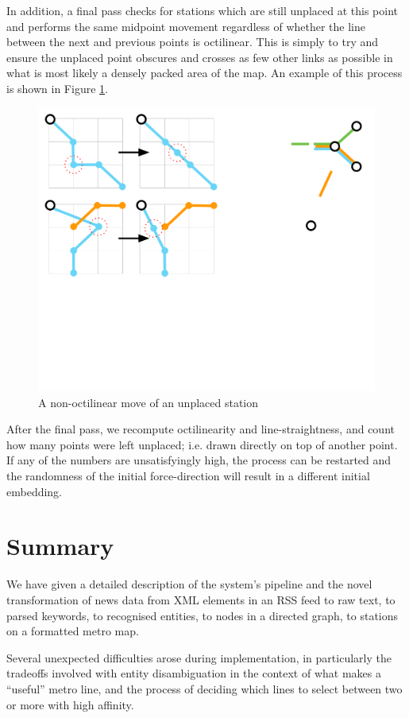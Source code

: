 In addition, a final pass checks for stations which are still unplaced at this point and performs the same midpoint movement regardless of whether the line between the next and previous points is octilinear. This is simply to try and ensure the unplaced point obscures and crosses as few other links as possible in what is most likely a densely packed area of the map. An example of this process is shown in Figure \ref{fig:nonoct}.
\begin{figure}[htbp!]
	\centering
	\includegraphics[width=.7\textwidth]{img/implementation/averagingnonoctilinear.pdf}
	\caption{A non-octilinear move of an unplaced station}
	\label{fig:nonoct}
\end{figure}

After the final pass, we recompute octilinearity and line-straightness, and count how many points were left unplaced; i.e. drawn directly on top of another point. If any of the numbers are unsatisfyingly high, the process can be restarted and the randomness of the initial force-direction will result in a different initial embedding.

\section{Summary}

We have given a detailed description of the system's pipeline and the novel transformation of news data from XML elements in an RSS feed to raw text, to parsed keywords, to recognised entities, to nodes in a directed graph, to stations on a formatted metro map.

Several unexpected difficulties arose during implementation, in particularly the tradeoffs involved with entity disambiguation in the context of what makes a ``useful'' metro line, and the process of deciding which lines to select between two or more with high affinity. 

